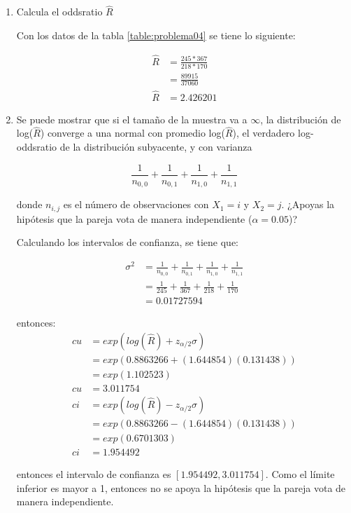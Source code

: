 \begin{enumerate}
	\item Calcula el oddsratio $\hat{R}$

	      Con los datos de la tabla \ref{table:problema04} se tiene lo siguiente:

	      \begin{align*}
		      \hat{R} & = \frac{245*367}{218*170} \\
		              & = \frac{89915}{37060}     \\
		      \hat{R} & = 2.426201
	      \end{align*}


	\item Se puede mostrar que si el tamaño de la muestra va a $\infty$, la distribución de log($\hat{R}$) converge a una normal con promedio log($\hat{R}$), el verdadero log-oddsratio de la distribución subyacente, y con varianza

	      \begin{equation*}
		      \frac{1}{n_{0,0}} + \frac{1}{n_{0,1}} + \frac{1}{n_{1,0}} + \frac{1}{n_{1,1}}
	      \end{equation*}

	      donde $n_{i,j}$ es el número de  observaciones con $X_1=i$ y $X_2=j$. ¿Apoyas la hipótesis que la pareja vota de manera independiente ($\alpha=0.05$)?

	      Calculando los intervalos de confianza, se tiene que:

	      \begin{align*}
		      \sigma^2 & = \frac{1}{n_{0,0}} + \frac{1}{n_{0,1}} + \frac{1}{n_{1,0}} + \frac{1}{n_{1,1}} \\
		               & = \frac{1}{245} + \frac{1}{367} + \frac{1}{218} + \frac{1}{170}                 \\
		               & = 0.01727594
	      \end{align*}

	      entonces:
	      \begin{align*}
		      cu & = exp(log(\hat{R}) + z_{\alpha/2} \sigma) \\
		         & = exp(0.8863266 + (1.644854)(0.131438) )  \\
		         & = exp(1.102523)                           \\
		      cu & = 3.011754                                \\
		      ci & = exp(log(\hat{R}) - z_{\alpha/2} \sigma) \\
		         & = exp(0.8863266 - (1.644854)(0.131438) )  \\
		         & = exp(0.6701303)                          \\
		      ci & = 1.954492
	      \end{align*}

	      entonces el intervalo de confianza es $[1.954492,3.011754]$. Como el límite inferior es mayor a 1, entonces no se apoya la hipótesis que la pareja vota de manera independiente.
\end{enumerate}
